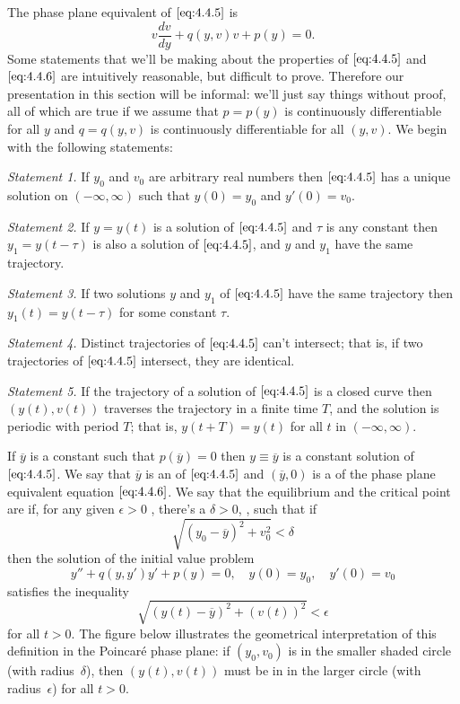 \documentclass{ximera}
\begin{document}
The phase plane equivalent of $\eqref{eq:4.4.5}$ is
\begin{equation}\label{eq:4.4.6}
v\frac{dv}{dy}+q(y,v)v+p(y)=0.
\end{equation}
Some  statements that we'll be making about the properties of
$\eqref{eq:4.4.5}$ and $\eqref{eq:4.4.6}$ are intuitively reasonable, but
difficult to prove.
Therefore our presentation in this section will be informal: we'll
just say things without proof, all of which are true if we assume that
$p=p(y)$ is continuously differentiable for all $y$ and $q=q(y,v)$ is
continuously differentiable for all $(y,v)$.
 We begin with the following statements:
 
\begin{fact}

\textit{Statement 1.} If $y_0$ and $v_0$ are arbitrary real numbers then
$\eqref{eq:4.4.5}$ has a unique solution on $(-\infty,\infty)$ such that
$y(0)=y_0$ and $y'(0)=v_0$.
 
\textit{Statement 2.} If $y=y(t)$ is a solution of $\eqref{eq:4.4.5}$
and
$\tau$ is any constant then $y_1=y(t-\tau)$ is also a solution of
$\eqref{eq:4.4.5}$, and $y$ and $y_1$ have the same trajectory.
 
\textit{Statement 3.}   If two solutions $y$ and $y_1$ of
$\eqref{eq:4.4.5}$ have the same trajectory then  $y_1(t)=y(t-\tau)$
for some constant $\tau$.
 
\textit{Statement 4.} Distinct trajectories of $\eqref{eq:4.4.5}$ can't
intersect; that is, if two trajectories of $\eqref{eq:4.4.5}$
intersect,  they are identical.
 
 
\textit{Statement 5.} If the trajectory of a solution of
$\eqref{eq:4.4.5}$
is a closed curve then  $(y(t),v(t))$ traverses the
trajectory in a finite time $T$, and the solution is periodic with
period $T$; that is, $y(t+T)=y(t)$ for all $t$ in $(-\infty,\infty)$.
\end{fact}
 
 
If $\overline{y}$ is a constant such that $p(\overline{y})=0$ then
$y\equiv\overline{y}$ is a constant solution of $\eqref{eq:4.4.5}$. We say
that $\overline{y}$ is an  of $\eqref{eq:4.4.5}$ and
 $(\overline{y},0)$ is a  of the phase plane
equivalent equation $\eqref{eq:4.4.6}$. We say that the equilibrium and
the critical point are  if, for any given $\epsilon>0$
, there's a $\delta>0$,
, such that if
$$
\sqrt{(y_0-\overline{y})^2+v_0^2}<\delta
$$
then the  solution of the initial value problem
$$
y''+q(y,y')y'+p(y)=0,\quad y(0)=y_0,\quad y'(0)=v_0
$$
satisfies the inequality
$$
\sqrt{(y(t)-\overline{y})^2+(v(t))^2}<\epsilon
$$
for all $t>0$. The figure below illustrates the geometrical
interpretation of this definition in the Poincar\'e phase plane: if
$(y_0,v_0)$ is in the smaller shaded circle (with radius~$\delta$), then
$(y(t),v(t))$ must be in in the larger circle (with
radius~$\epsilon$) for all $t>0$.
\end{document}
